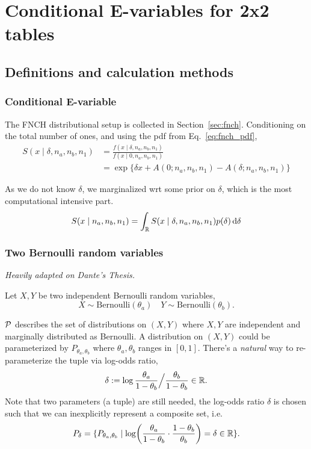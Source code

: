 \clearpage

\section{Conditional E-variables for 2x2 tables}
\label{sec:conditional-2x2}



\subsection{Definitions and calculation methods}

\subsubsection{Conditional E-variable}

The FNCH distributional setup is collected in Section~\ref{sec:fnch}.
Conditioning on the total number of ones,
and using the pdf from Eq.~\ref{eq:fnch_pdf},
\begin{align}
 	S(x \mid \delta,n_a,n_b,n_1) 
 	&= \frac{f(x\mid \delta,n_a,n_b,n_1)}{f(x\mid 0,n_a,n_b,n_1)} \\
 	&= \exp\{\delta x + A(0; n_a,n_b,n_1) - A(\delta; n_a,n_b,n_1)\}
\end{align}


As we do not know $\delta$, we marginalized wrt some prior on $\delta$,
which is the most computational intensive part.
$$
	S(x \mid n_a,n_b,n_1) = \int_{\mathbb{R}} S(x \mid \delta,n_a,n_b,n_1) p(\delta) \dd{\delta}
$$

\subsubsection{Two Bernoulli random variables}

\emph{Heavily adapted on Dante's Thesis.}

Let $X,Y$ be two independent Bernoulli random variables,
\begin{equation*}
	X \sim \mathrm{Bernoulli}(\theta_a) \quad
	Y \sim \mathrm{Bernoulli}(\theta_b).
\end{equation*}

$\mathcal{P}$ describes the set of distributions on $(X,Y)$ 
where $X,Y$ are independent and marginally distributed as Bernoulli.
A distribution on $(X,Y)$ could be parameterized by
$P_{\theta_a,\theta_b}$ where $\theta_a,\theta_b$ ranges in $[0,1]$.
There's a \emph{natural} way to re-parameterize the tuple via log-odds ratio,
\begin{equation*}
	\delta:= \log \frac{\theta_a}{1-\theta_b} \Big/ \frac{\theta_b}{1-\theta_b} \in \Rf.
\end{equation*}
Note that two parameters (a tuple) are still needed,
the log-odds ratio $\delta$ is chosen such that 
we can inexplicitly represent a composite set, i.e.
\begin{equation*}
	P_{\delta} = \{P_{\theta_a,\theta_b} \mid \log(\frac{\theta_a}{1-\theta_b} \cdot \frac{1-\theta_b}{\theta_b}) = \delta \in \Rf \}.
\end{equation*}

